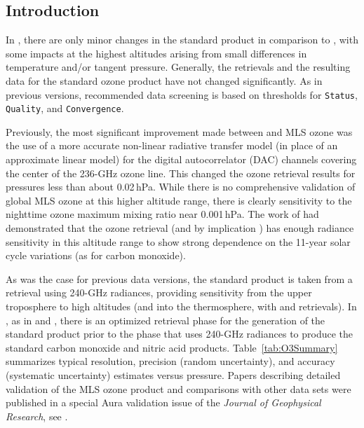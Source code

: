   
\subsection{Introduction}

In \thisv, there are only minor changes in the standard  product in comparison to \prevv, with some impacts at the highest altitudes arising from small differences in temperature and/or tangent pressure. Generally, the retrievals and the resulting data for the standard ozone product have not changed significantly. As in previous versions, recommended \thisv data screening is based on thresholds for \texttt{Status}, \texttt{Quality}, and \texttt{Convergence}.

Previously, the most significant improvement made between \viv and \prevv MLS ozone was the use of a more accurate non-linear radiative transfer model (in place of an approximate linear model) for the digital autocorrelator (DAC) channels covering the center of the 236\nobreakdash-GHz ozone line. This changed the ozone retrieval results for pressures less than about 0.02\,hPa. While there is no comprehensive validation of global MLS ozone at this higher altitude range, there is clearly sensitivity to the nighttime ozone maximum mixing ratio near 0.001\,hPa. The work of \citet{LeeAndWu:2020} had demonstrated that the \viv ozone retrieval (and by implication \thisv) has enough radiance sensitivity in this altitude range to show strong dependence on the 11-year solar cycle variations (as for carbon monoxide).

As was the case for previous data versions, the \thisv standard  product is taken from a retrieval using 240\nobreakdash-GHz radiances, providing sensitivity from the upper troposphere to high altitudes (and into the thermosphere, with \prevv and \thisv retrievals). In \thisv, as in \prevv and \viv, there is an optimized retrieval phase for the generation of the  standard product prior to the phase that uses 240\nobreakdash-GHz radiances to produce the standard carbon monoxide and nitric acid products. Table~\ref{tab:O3Summary} summarizes typical  resolution, precision (random uncertainty), and accuracy (systematic uncertainty) estimates versus pressure. 
Papers describing detailed validation of the MLS \vii ozone product and comparisons with other data sets were published in a special Aura validation issue of the \emph{Journal of Geophysical Research}, see \citep{FroidevauxEtal:2008:O3, JiangEtal:2007:MLSO3Valid, LiveseyEtal:2008}.

